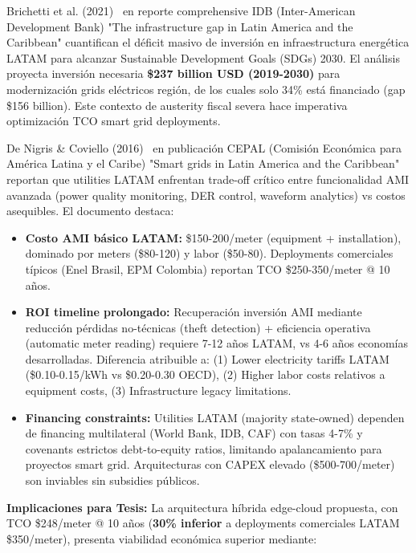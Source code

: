 Brichetti et al. (2021)~\cite{brichettiInfrastructureGapLatin2021} en reporte comprehensive IDB (Inter-American Development Bank) "The infrastructure gap in Latin America and the Caribbean" cuantifican el déficit masivo de inversión en infraestructura energética LATAM para alcanzar Sustainable Development Goals (SDGs) 2030. El análisis proyecta inversión necesaria \textbf{\$237 billion USD (2019-2030)} para modernización grids eléctricos región, de los cuales solo 34\% está financiado (gap \$156 billion). Este contexto de austerity fiscal severa hace imperativa optimización TCO smart grid deployments.

De Nigris \& Coviello (2016)~\cite{denigrisSmartGridsLatin2016} en publicación CEPAL (Comisión Económica para América Latina y el Caribe) "Smart grids in Latin America and the Caribbean" reportan que utilities LATAM enfrentan trade-off crítico entre funcionalidad AMI avanzada (power quality monitoring, DER control, waveform analytics) vs costos asequibles. El documento destaca:

\begin{itemize}
\item \textbf{Costo AMI básico LATAM:} \$150-200/meter (equipment + installation), dominado por meters (\$80-120) y labor (\$50-80). Deployments comerciales típicos (Enel Brasil, EPM Colombia) reportan TCO \$250-350/meter @ 10 años.

\item \textbf{ROI timeline prolongado:} Recuperación inversión AMI mediante reducción pérdidas no-técnicas (theft detection) + eficiencia operativa (automatic meter reading) requiere 7-12 años LATAM, vs 4-6 años economías desarrolladas. Diferencia atribuible a: (1) Lower electricity tariffs LATAM (\$0.10-0.15/kWh vs \$0.20-0.30 OECD), (2) Higher labor costs relativos a equipment costs, (3) Infrastructure legacy limitations.

\item \textbf{Financing constraints:} Utilities LATAM (majority state-owned) dependen de financing multilateral (World Bank, IDB, CAF) con tasas 4-7\% y covenants estrictos debt-to-equity ratios, limitando apalancamiento para proyectos smart grid. Arquitecturas con CAPEX elevado (\$500-700/meter) son inviables sin subsidies públicos.
\end{itemize}

\textbf{Implicaciones para Tesis:} La arquitectura híbrida edge-cloud propuesta, con TCO \$248/meter @ 10 años (\textbf{30\% inferior} a deployments comerciales LATAM \$350/meter), presenta viabilidad económica superior mediante:

